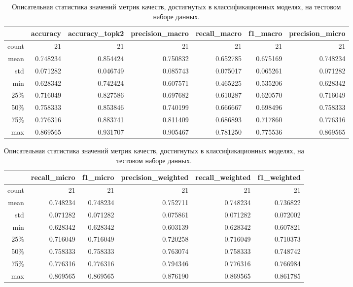 \documentclass[a4paper,12pt]{extarticle}
\begin{document}
\begin{table}[ht]
	\caption{Описательная статистика значений метрик качеств, достигнутых в классификационных моделях, на тестовом наборе данных.} 
	\label{table:metrics_statictics_test}
	\footnotesize
	\centering
	\begin{tabular}{r|rrrrrr}
		\toprule
		{} & \multicolumn{1}{c}{accuracy} & \multicolumn{1}{c}{accuracy\_topk2} & \multicolumn{1}{c}{precision\_macro} & \multicolumn{1}{c}{recall\_macro} & \multicolumn{1}{c}{f1\_macro} & \multicolumn{1}{c}{precision\_micro}\\
		\midrule
		count &	21 & 21 & 21 & 21 & 21 & 21\\
		mean  & 0.748234 & 0.854424 & 0.750832 & 0.652785 & 0.675169 & 0.748234\\
		std   & 0.071282 & 0.046749 & 0.085743 & 0.075017 & 0.065261 & 0.071282\\
		min   & 0.628342 & 0.742424 & 0.607571 & 0.465225 & 0.535206 & 0.628342\\
		25\%  & 0.716049 & 0.827586 & 0.697682 & 0.610287 & 0.620570 & 0.716049\\
		50\%  & 0.758333 & 0.853846 & 0.740199 & 0.666667 & 0.698496 & 0.758333\\
		75\%  &	0.776316 & 0.883741 & 0.811409 & 0.686893 & 0.717860 & 0.776316\\
		max   &	0.869565 & 0.931707 & 0.905467 & 0.781250 & 0.775536 & 0.869565\\
		\bottomrule
	\end{tabular}
	\begin{tabular}{r|rrrrr}
		\toprule
		{} & \multicolumn{1}{c}{recall\_micro} & \multicolumn{1}{c}{f1\_micro} & \multicolumn{1}{c}{precision\_weighted} & \multicolumn{1}{c}{recall\_weighted} & \multicolumn{1}{c}{f1\_weighted}\\
		\midrule
		count &	21 & 21 & 21 & 21 & 21\\
		mean  & 0.748234 & 0.748234 & 0.752711 & 0.748234 & 0.736822\\
		std   & 0.071282 & 0.071282 & 0.075861 & 0.071282 & 0.072002\\
		min   & 0.628342 & 0.628342 & 0.603139 & 0.628342 & 0.607821\\
		25\%  &	0.716049 & 0.716049 & 0.720258 & 0.716049 & 0.710373\\
		50\%  &	0.758333 & 0.758333 & 0.763074 & 0.758333 & 0.748742\\
		75\%  &	0.776316 & 0.776316 & 0.794346 & 0.776316 & 0.766984\\
		max   & 0.869565 & 0.869565 & 0.876190 & 0.869565 & 0.861785\\
		\bottomrule
	\end{tabular}
\end{table}
\end{document}
